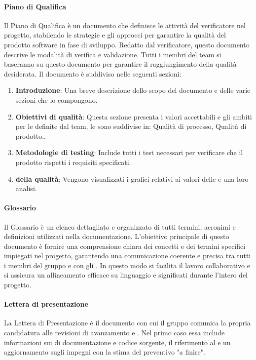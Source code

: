 \paragraph{Piano di Qualifica}
Il Piano di Qualifica è un documento che definisce le attività del verificatore nel progetto, stabilendo le strategie e gli approcci per garantire la qualità del prodotto software in fase di sviluppo. Redatto dal verificatore, questo documento descrive le modalità di verifica e validazione. Tutti i membri del team si baseranno su questo documento per garantire il raggiungimento della qualità desiderata.
Il documento è suddiviso nelle seguenti sezioni: 
\begin{enumerate}
    \item \textbf{Introduzione}: Una breve descrizione dello scopo del documento e delle varie sezioni che lo compongono.
    \item \textbf{Obiettivi di qualità}: Questa sezione presenta i valori accettabili e gli ambiti per le  definite dal team, le  sono suddivise in: Qualità di processo, Qualità di prodotto..
    \item \textbf{Metodologie di testing}: Include tutti i test necessari per verificare che il prodotto rispetti i requisiti specificati.
    \item \textbf{ della qualità}: Vengono visualizzati i grafici relativi ai valori delle  e una loro analisi.
\end{enumerate}

\paragraph{Glossario}
Il Glossario è un elenco dettagliato e organizzato di tutti termini, acronimi e definizioni utilizzati nella documentazione. L’obiettivo principale di questo documento è fornire una comprensione chiara dei concetti e dei termini specifici impiegati nel progetto, garantendo una comunicazione coerente e precisa tra tutti i membri del gruppo e con gli . In questo modo si facilita il lavoro collaborativo e si assicura un allineamento efficace su linguaggio e significati durante l'intero  del progetto.

\paragraph{Lettera di presentazione}
La Lettera di Presentazione è il documento con cui il gruppo comunica la propria candidatura alle revisioni di avanzamento  e . Nel primo caso essa include informazioni sui  di documentazione e codice sorgente, il riferimento al  e un aggiornamento sugli impegni con la stima del preventivo "a finire". 